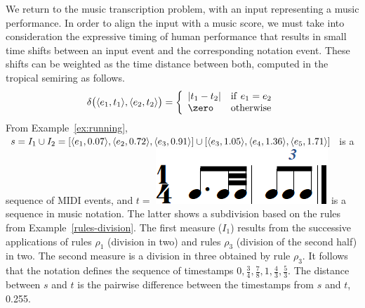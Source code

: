 \begin{example}\label{distance-time}
We return to the music transcription problem, with an input  representing
a music performance. In order to align the
input with a music score, we must take into consideration
the expressive timing of human performance that
results in small time shifts between an input event and the corresponding
notation event.  These shifts can be weighted as the time distance between both,
computed in the tropical semiring as follows.
$$\delta\bigl(\<e_1, t_1>, \<e_2, t_2>\bigr) =
\left\{
\begin{array}{ll}
   | t_1 - t_2 | & \mathrm{if}\  e_1 = e_2 \\
   \zero  & \mathrm{otherwise}
\end{array}
\right.$$
From Example~\ref{ex:running}, $s = I_1 \cup I_2 =
 [ \<e_1, 0.07>, \<e_2, 0.72>, \<e_3, 0.91>] \cup [ \<e_3, 1.05>, \<e_4, 1.36>, \<e_5, 1.71>]$
 is a sequence of MIDI events, and $t =$ \includegraphics[scale=0.20]{pictures/score5.png}
 is a sequence in music notation.
 The latter shows a subdivision 
 based on the rules from Example~\ref{rules-division}. The first measure ($I_1$)
 results from the successive applications of  rules $\rho_1$ (division in two)
and rules $\rho_3$ (division of the second half) in two. The second measure
is a division in three obtained by rule $\rho_3$. It follows that the notation
defines the sequence of timestamps $0, \frac{3}{4}, \frac{7}{8}, 1, \frac{4}{3}, \frac{5}{3}$.
The distance between $s$ and $t$ is the  pairwise difference between the
timestamps from $s$ and $t$, 0.255.
\endex
\end{example}
